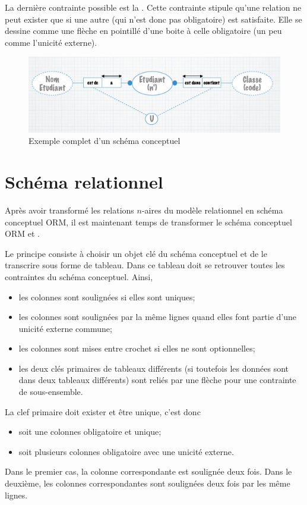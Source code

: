 La dernière contrainte possible est la .
Cette contrainte stipule qu'une relation ne peut exister que
si une autre (qui n'est donc pas obligatoire) est satisfaite.
Elle se dessine comme une flèche en pointillé d'une boite
à celle obligatoire (un peu comme l'unicité externe).

\begin{figure}[h]
  \centering
  \includegraphics[scale=0.8]{schema_conceptuel_complet}
  \caption{Exemple complet d'un schéma conceptuel}
  \label{fig:schema_conceptuel_complet}
\end{figure}

\section{Schéma relationnel}
Après avoir transformé les relations $n$-aires du modèle relationnel
en schéma conceptuel ORM,
il est maintenant temps de transformer le schéma conceptuel
ORM et .

Le principe consiste à choisir un objet clé du schéma conceptuel
et de le transcrire sous forme de tableau.
Dans ce tableau doit se retrouver toutes les contraintes du schéma conceptuel.
Ainsi,
\begin{itemize}
  \item les colonnes sont soulignées si elles sont uniques;
  \item les colonnes sont soulignées par la même lignes quand elles
    font partie d'une unicité externe commune;
  \item les colonnes sont mises entre crochet si elles ne sont optionnelles;
  \item les deux clés primaires de tableaux différents
    (si toutefois les données sont dans deux tableaux différents)
    sont reliés par une flèche pour une
    contrainte de sous-ensemble.
\end{itemize}

La clef primaire doit exister et être unique, c'est donc
\begin{itemize}
  \item soit une colonnes obligatoire et unique;
  \item soit plusieurs colonnes obligatoire avec une unicité externe.
\end{itemize}
Dans le premier cas, la colonne correspondante est soulignée deux fois.
Dans le deuxième, les colonnes correspondantes sont soulignées deux fois
par les même lignes.

